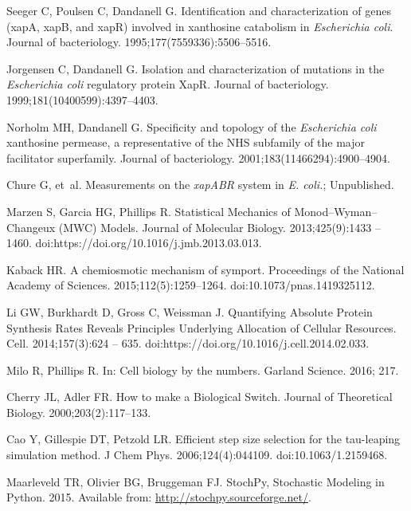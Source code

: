 \documentclass[10pt,letterpaper]{article}
\begin{document}
\begin{thebibliography}{10}
		Seeger C, Poulsen C, Dandanell G.
		\newblock Identification and characterization of genes (xapA, xapB, and xapR)
		involved in xanthosine catabolism in \emph{Escherichia coli}.
		\newblock Journal of bacteriology. 1995;177(7559336):5506--5516.
		
		Jorgensen C, Dandanell G.
		\newblock Isolation and characterization of mutations in the \emph{Escherichia
			coli} regulatory protein XapR.
		\newblock Journal of bacteriology. 1999;181(10400599):4397--4403.
		
		Norholm MH, Dandanell G.
		\newblock Specificity and topology of the \emph{Escherichia coli} xanthosine
		permease, a representative of the NHS subfamily of the major facilitator
		superfamily.
		\newblock Journal of bacteriology. 2001;183(11466294):4900--4904.
		
		Chure G, et~al.
		\newblock Measurements on the \emph{xapABR} system in \emph{E. coli.};
		Unpublished.
		
		Marzen S, Garcia HG, Phillips R.
		\newblock Statistical Mechanics of Monod--Wyman--Changeux (MWC) Models.
		\newblock Journal of Molecular Biology. 2013;425(9):1433 -- 1460.
		\newblock doi:{https://doi.org/10.1016/j.jmb.2013.03.013}.
		
		Kaback HR.
		\newblock A chemiosmotic mechanism of symport.
		\newblock Proceedings of the National Academy of Sciences.
		2015;112(5):1259--1264.
		\newblock doi:{10.1073/pnas.1419325112}.
		
		Li GW, Burkhardt D, Gross C, Weissman J.
		\newblock Quantifying Absolute Protein Synthesis Rates Reveals Principles
		Underlying Allocation of Cellular Resources.
		\newblock Cell. 2014;157(3):624 -- 635.
		\newblock doi:{https://doi.org/10.1016/j.cell.2014.02.033}.
		
		Milo R, Phillips R.
		\newblock In: Cell biology by the numbers. Garland Science. 2016; 217.
		
		Cherry JL, Adler FR.
		\newblock How to make a Biological Switch.
		\newblock Journal of Theoretical Biology. 2000;203(2):117--133.
		
		Cao Y, Gillespie DT, Petzold LR.
		\newblock Efficient step size selection for the tau-leaping simulation method.
		\newblock J Chem Phys. 2006;124(4):044109.
		\newblock doi:{10.1063/1.2159468}.
		
		Maarleveld TR, Olivier BG, Bruggeman FJ. StochPy, Stochastic Modeling in
		Python. 2015.
		\newblock Available from: \url{http://stochpy.sourceforge.net/}.
		
	\end{thebibliography}
	
\end{document}
